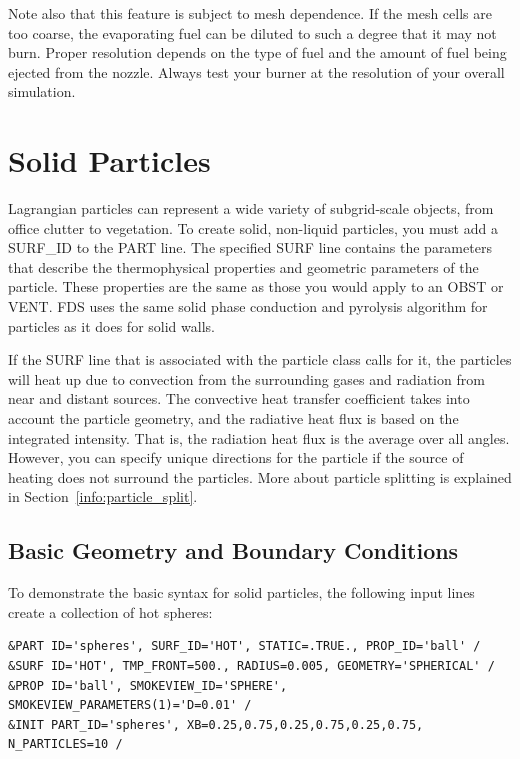 \documentclass[11pt]{book}
\begin{document}
Note also that this feature is subject to mesh
dependence. If the mesh cells are too coarse, the
evaporating fuel can be diluted to such a degree that it
may not burn. Proper resolution depends on the type of
fuel and the amount of fuel being ejected from the
nozzle. Always test your burner at the resolution of your overall simulation.


\clearpage

\section{Solid Particles}
\label{info:PART_SURF}

Lagrangian particles can represent a wide variety of subgrid-scale objects, from office clutter to vegetation. To create solid, non-liquid particles, you must add a {\ct SURF\_ID} to the {\ct PART} line. The specified {\ct SURF} line contains the parameters that describe the thermophysical properties and geometric parameters of the particle. These properties are the same as those you would apply to an {\ct OBST} or {\ct VENT}. FDS uses the same solid phase conduction and pyrolysis algorithm for particles as it does for solid walls.

If the {\ct SURF} line that is associated with the particle class calls for it, the particles will heat up due to convection from the surrounding gases and radiation from near and distant sources. The convective heat transfer coefficient takes into account the particle geometry, and the radiative heat flux is based on the integrated intensity. That is, the radiation heat flux is the average over all angles. However, you can specify unique directions for the particle if the source of heating does not surround the particles. More about particle splitting is explained in Section~\ref{info:particle_split}.


\subsection{Basic Geometry and Boundary Conditions}
\label{info:PART_GEOMETRY}

To demonstrate the basic syntax for solid particles, the following input lines create a collection of hot spheres:

\begin{lstlisting}
&PART ID='spheres', SURF_ID='HOT', STATIC=.TRUE., PROP_ID='ball' /
&SURF ID='HOT', TMP_FRONT=500., RADIUS=0.005, GEOMETRY='SPHERICAL' /
&PROP ID='ball', SMOKEVIEW_ID='SPHERE', SMOKEVIEW_PARAMETERS(1)='D=0.01' /
&INIT PART_ID='spheres', XB=0.25,0.75,0.25,0.75,0.25,0.75, N_PARTICLES=10 /
\end{lstlisting}
\end{document}
